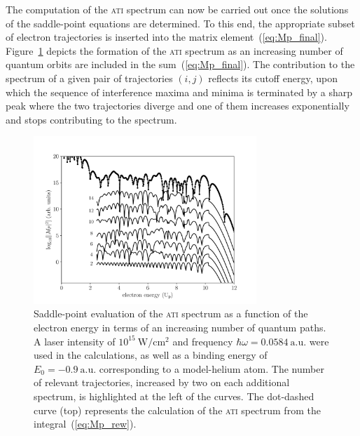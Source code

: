 
The computation of the \textsc{ati} spectrum can now be carried out
once the solutions of the saddle-point equations are determined. To
this end, the appropriate subset of electron trajectories is inserted
into the matrix
element~(\ref{eq:Mp_final}). Figure~\ref{fig:ati_spectrum} depicts the
formation of the \textsc{ati} spectrum as an increasing number of
quantum orbits are included in the sum~(\ref{eq:Mp_final}). The
contribution to the spectrum of a given pair of trajectories $(i,j)$
reflects its cutoff energy, upon which the sequence of interference
maxima and minima is terminated by a sharp peak where the two
trajectories diverge and one of them increases exponentially and stops
contributing to the spectrum.



\begin{figure}
  \centering \includegraphics[width =
    0.75\textwidth]{figures/ch_ATI_SPA/rescattering/14pathsvsqm.pdf}
  \caption{Saddle-point evaluation of the \textsc{ati} spectrum as a
    function of the electron energy in terms of an increasing number
    of quantum paths. A laser intensity of
    $10^{15}\ \mathrm{W/cm^{2}}$ and frequency $\hbar\omega =
    0.0584\ \mathrm{a.u.}$ were used in the calculations, as well as a
    binding energy of $E_{0} = -0.9\ \mathrm{a.u.}$ corresponding to a
    model-helium atom. The number of relevant trajectories, increased
    by two on each additional spectrum, is highlighted at the left of
    the curves. The dot-dashed curve (top) represents the calculation
    of the \textsc{ati} spectrum from the integral~(\ref{eq:Mp_rew}).}
  \label{fig:ati_spectrum}
\end{figure}








